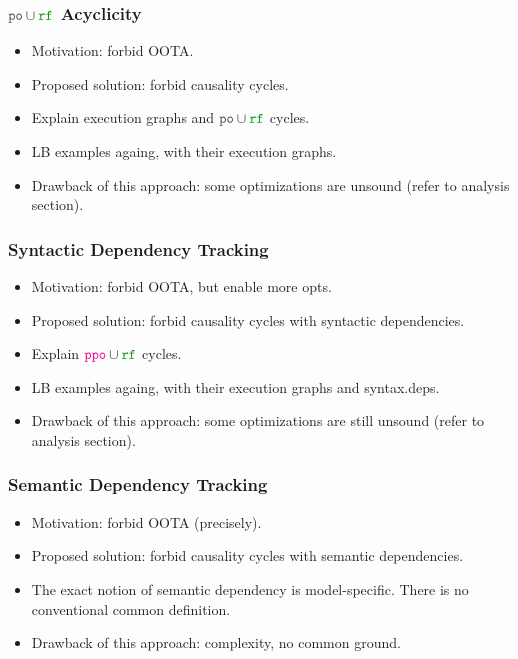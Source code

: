 

\subsubsection{$\lPO\cup\lRF$ Acyclicity}

\begin{itemize}
  \item Motivation: forbid OOTA.
  \item Proposed solution: forbid causality cycles. 
  \item Explain execution graphs and $\lPO\cup\lRF$ cycles.
  \item LB examples againg, with their execution graphs.
  \item Drawback of this approach: some optimizations are unsound 
    (refer to analysis section).
\end{itemize}

\subsubsection{Syntactic Dependency Tracking}

\begin{itemize}
  \item Motivation: forbid OOTA, but enable more opts.
  \item Proposed solution: forbid causality cycles with syntactic dependencies. 
  \item Explain $\lPPO\cup\lRF$ cycles.
  \item LB examples againg, with their execution graphs and syntax.deps.
  \item Drawback of this approach: some optimizations are still unsound 
    (refer to analysis section).
\end{itemize}

\subsubsection{Semantic Dependency Tracking}

\begin{itemize}
  \item Motivation: forbid OOTA (precisely).
  \item Proposed solution: forbid causality cycles with semantic dependencies. 
  \item The exact notion of semantic dependency is model-specific.
        There is no conventional common definition.
  \item Drawback of this approach: complexity, no common ground.
\end{itemize}


